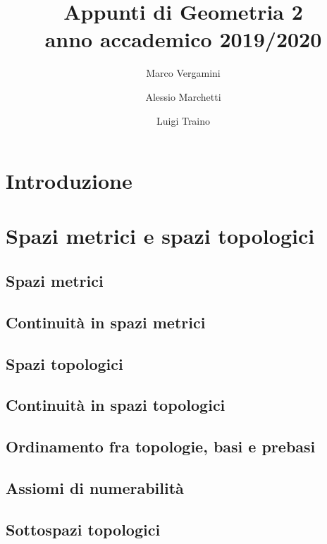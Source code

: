 \documentclass{article}
\title{Appunti di Geometria 2 \\ anno accademico 2019/2020}
\date{}
\author{Marco Vergamini \and Alessio Marchetti \and Luigi Traino}
\begin{document}
\maketitle
\newpage
\tableofcontents
\newpage


\section{Introduzione}



\section{Spazi metrici e spazi topologici}

\subsection{Spazi metrici}


\subsection{Continuità in spazi metrici}


\subsection{Spazi topologici}


\subsection{Continuità in spazi topologici}


\subsection{Ordinamento fra topologie, basi e prebasi}


\subsection{Assiomi di numerabilità}


\subsection{Sottospazi topologici}

\end{document}
